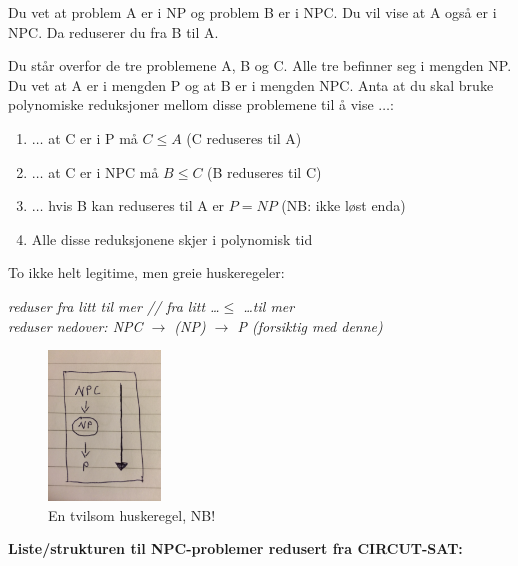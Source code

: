 \documentclass[a4paper, 10pt]{article}
\begin{document}
\begin{algorithmic}
\begin{algoritmic}
\noindent Du vet at problem A er i NP og problem B er i NPC. Du vil vise at A også er i NPC. Da reduserer du fra B til A.\\ \hfill

\noindent Du står overfor de tre problemene A, B og C. Alle tre befinner seg i mengden NP. Du vet at A er i mengden P og at B er i mengden NPC. Anta at du skal bruke polynomiske reduksjoner mellom disse problemene til å vise $\dots$:

\begin{enumerate}
        \item $\dots$ at C er i P må $C \leq A$ (C reduseres til A)
        \item $\dots$ at C er i NPC må $B \leq C$ (B reduseres til C)
        \item $\dots$ hvis B kan reduseres til A er $P = NP$ (NB: ikke løst enda)
        \item Alle disse reduksjonene skjer i polynomisk tid
\end{enumerate}

\noindent To ikke helt legitime, men greie huskeregeler: 
\begin{center}
\textit{reduser fra litt til mer // fra litt \dots $\leq$ \dots til mer\\ }
\textit{reduser nedover: NPC $\rightarrow$ (NP) $\rightarrow$ P (forsiktig med denne)\\ \hfill}
\end{center}

\begin{figure}[hbt]
    \begin{center}
        \includegraphics[width=3cm] {cheat.jpg}
        \caption{En tvilsom huskeregel, NB!}
    \end{center}
\end{figure}

\noindent \textbf{Liste/strukturen til NPC-problemer redusert fra CIRCUT-SAT:}


\end{algoritmic}
\end{algorithmic}
\end{document}
